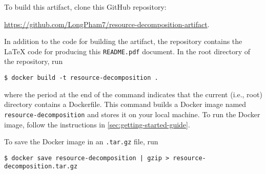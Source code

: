 To build this artifact, clone this GitHub repository:
\begin{center}
  \url{https://github.com/LongPham7/resource-decomposition-artifact}.
\end{center}
%
In addition to the code for building the artifact, the repository contains the
\LaTeX{} code for producing this \texttt{README.pdf} document.
%
In the root directory of the repository, run
\begin{verbatim}
$ docker build -t resource-decomposition .
\end{verbatim}
where the period at the end of the command indicates that the current (i.e.,
root) directory contains a Dockerfile.
%
This command builds a Docker image named \texttt{resource-decomposition} and
stores it on your local machine.
%
To run the Docker image, follow the instructions in
\cref{sec:getting-started-guide}.

To save the Docker image in an \texttt{.tar.gz} file, run
\begin{verbatim}
$ docker save resource-decomposition | gzip > resource-decomposition.tar.gz
\end{verbatim}
